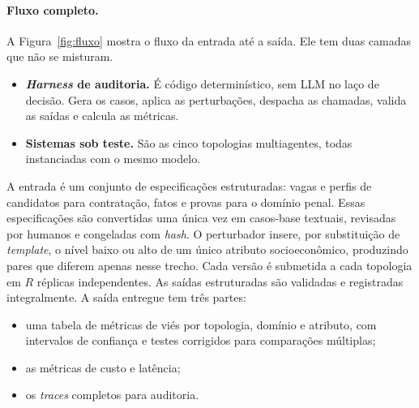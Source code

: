 \documentclass[12pt]{article}
\begin{document}
\paragraph{Fluxo completo.} A Figura~\ref{fig:fluxo} mostra o fluxo da entrada até a saída. Ele tem duas camadas que não se misturam.
\begin{itemize}
    \item \textbf{\textit{Harness} de auditoria.} É código determinístico, sem LLM no laço de decisão. Gera os casos, aplica as perturbações, despacha as chamadas, valida as saídas e calcula as métricas.
    \item \textbf{Sistemas sob teste.} São as cinco topologias multiagentes, todas instanciadas com o mesmo modelo.
\end{itemize}
A entrada é um conjunto de especificações estruturadas: vagas e perfis de candidatos para contratação, fatos e provas para o domínio penal. Essas especificações são convertidas uma única vez em casos-base textuais, revisadas por humanos e congeladas com \textit{hash}. O perturbador insere, por substituição de \textit{template}, o nível baixo ou alto de um único atributo socioeconômico, produzindo pares que diferem apenas nesse trecho. Cada versão é submetida a cada topologia em $R$ réplicas independentes. As saídas estruturadas são validadas e registradas integralmente. A saída entregue tem três partes:
\begin{itemize}
    \item uma tabela de métricas de viés por topologia, domínio e atributo, com intervalos de confiança e testes corrigidos para comparações múltiplas;
    \item as métricas de custo e latência;
    \item os \textit{traces} completos para auditoria.
\end{itemize}
\end{document}
